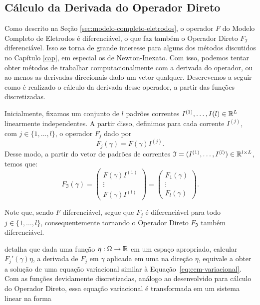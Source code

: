 \subsection{Cálculo da Derivada do Operador Direto}


Como descrito na Seção \ref{sec:modelo-completo-eletrodos}, o operador $F$ do Modelo Completo de Eletrodos é diferenciável, o que faz também o Operador Direto $F_{\mathfrak I}$ diferenciável. Isso se torna de grande interesse para alguns dos métodos discutidos no Capítulo \ref{cap}, em especial os de Newton-Inexato. Com isso, podemos tentar obter métodos de trabalhar computacionalmente com a derivada do operador, ou ao menos as derivadas direcionais dado um vetor qualquer. Descrevemos a seguir como é realizado o cálculo da derivada desse operador, a partir das funções discretizadas.

Inicialmente, fixamos um conjunto de $l$ padrões correntes $I^{(1)},\dots, I{(l)}\in \mathbb{R}^L$ linearmente independentes. A partir disso, definimos para cada corrente $I^{(j)}$, com $j \in\{1, \dots, l\}$, o operador $F_j$ dado por
\begin{equation*}
    F_j(\gamma) = F(\gamma) I^{(j)}.
\end{equation*}
Desse modo, a partir do vetor de padrões de correntes $\mathfrak I = (I^{(1)}, \dots, I^{(l)}) \in \mathbb{R}^{l \times L}$, temos que:
\begin{equation}
    F_{\mathfrak I} (\gamma)  = \begin{pmatrix}
        F(\gamma) I^{(1)} \\
        \vdots \\
        F(\gamma) I^{(l)}
    \end{pmatrix} = 
    \begin{pmatrix}
        F_1(\gamma) \\
        \vdots \\
        F_l(\gamma)
    \end{pmatrix}.
\end{equation}

Note que, sendo $F$ diferenciável, segue que $F_j$ é diferenciável para todo $j \in \{1, \dots, l\}$, consequentemente tornando o Operador Direto $F_{\mathfrak I}$ também diferenciável. 

 detalha que dada uma função $\eta: \Omega \to \mathbb{R}$ em um espaço apropriado, calcular $F_j'(\gamma)\eta$, a derivada de $F_j$ em $\gamma$ aplicada em uma na direção $\eta$, equivale a obter a solução de uma equação variacional similar à Equação~\eqref{eq:cem-variacional}. Com as funções devidamente discretizadas, análogo ao desenvolvido para cálculo do Operador Direto, essa equação variacional é transformada em um sistema linear na forma

